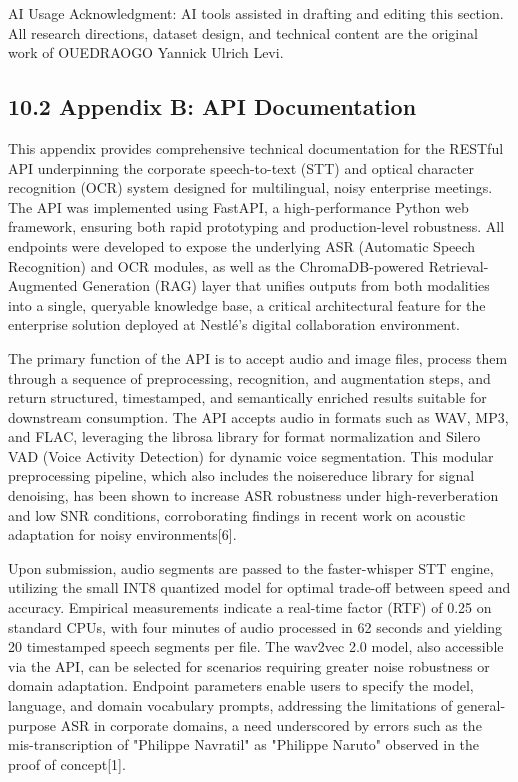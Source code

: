 \documentclass[12pt,a4paper]{article}
\begin{document}
AI Usage Acknowledgment: AI tools assisted in drafting and editing this section. All research directions, dataset design, and technical content are the original work of OUEDRAOGO Yannick Ulrich Levi.


\subsection{10.2 Appendix B: API Documentation}


This appendix provides comprehensive technical documentation for the RESTful API underpinning the corporate speech-to-text (STT) and optical character recognition (OCR) system designed for multilingual, noisy enterprise meetings. The API was implemented using FastAPI, a high-performance Python web framework, ensuring both rapid prototyping and production-level robustness. All endpoints were developed to expose the underlying ASR (Automatic Speech Recognition) and OCR modules, as well as the ChromaDB-powered Retrieval-Augmented Generation (RAG) layer that unifies outputs from both modalities into a single, queryable knowledge base, a critical architectural feature for the enterprise solution deployed at Nestlé’s digital collaboration environment.


The primary function of the API is to accept audio and image files, process them through a sequence of preprocessing, recognition, and augmentation steps, and return structured, timestamped, and semantically enriched results suitable for downstream consumption. The API accepts audio in formats such as WAV, MP3, and FLAC, leveraging the librosa library for format normalization and Silero VAD (Voice Activity Detection) for dynamic voice segmentation. This modular preprocessing pipeline, which also includes the noisereduce library for signal denoising, has been shown to increase ASR robustness under high-reverberation and low SNR conditions, corroborating findings in recent work on acoustic adaptation for noisy environments[6].


Upon submission, audio segments are passed to the faster-whisper STT engine, utilizing the small INT8 quantized model for optimal trade-off between speed and accuracy. Empirical measurements indicate a real-time factor (RTF) of 0.25 on standard CPUs, with four minutes of audio processed in 62 seconds and yielding 20 timestamped speech segments per file. The wav2vec 2.0 model, also accessible via the API, can be selected for scenarios requiring greater noise robustness or domain adaptation. Endpoint parameters enable users to specify the model, language, and domain vocabulary prompts, addressing the limitations of general-purpose ASR in corporate domains, a need underscored by errors such as the mis-transcription of "Philippe Navratil" as "Philippe Naruto" observed in the proof of concept[1].
\end{document}
